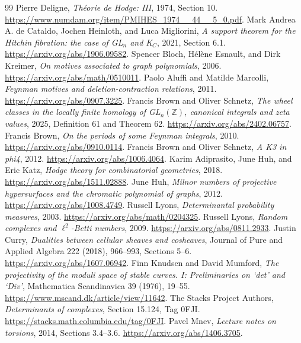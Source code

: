 \documentclass[11pt]{article}
\theoremstyle{definition}
\theoremstyle{remark}
\newcommand{\Z}{\mathbb Z}
\begin{document}
\begin{thebibliography}{99}
 Pierre Deligne, \emph{Th\'eorie de Hodge: III}, 1974, Section 10. \url{https://www.numdam.org/item/PMIHES_1974__44__5_0.pdf}.
 Mark Andrea A. de Cataldo, Jochen Heinloth, and Luca Migliorini, \emph{A support theorem for the Hitchin fibration: the case of GL\(_n\) and K\(_C\)}, 2021, Section 6.1. \url{https://arxiv.org/abs/1906.09582}.
 Spencer Bloch, H\'el\`ene Esnault, and Dirk Kreimer, \emph{On motives associated to graph polynomials}, 2006. \url{https://arxiv.org/abs/math/0510011}.
 Paolo Aluffi and Matilde Marcolli, \emph{Feynman motives and deletion-contraction relations}, 2011. \url{https://arxiv.org/abs/0907.3225}.
 Francis Brown and Oliver Schnetz, \emph{The wheel classes in the locally finite homology of GL\(_n(\Z)\), canonical integrals and zeta values}, 2025, Definition 61 and Theorem 62. \url{https://arxiv.org/abs/2402.06757}.
 Francis Brown, \emph{On the periods of some Feynman integrals}, 2010. \url{https://arxiv.org/abs/0910.0114}.
 Francis Brown and Oliver Schnetz, \emph{A K3 in phi4}, 2012. \url{https://arxiv.org/abs/1006.4064}.
 Karim Adiprasito, June Huh, and Eric Katz, \emph{Hodge theory for combinatorial geometries}, 2018. \url{https://arxiv.org/abs/1511.02888}.
 June Huh, \emph{Milnor numbers of projective hypersurfaces and the chromatic polynomial of graphs}, 2012. \url{https://arxiv.org/abs/1008.4749}.
 Russell Lyons, \emph{Determinantal probability measures}, 2003. \url{https://arxiv.org/abs/math/0204325}.
 Russell Lyons, \emph{Random complexes and \(\ell^2\)-Betti numbers}, 2009. \url{https://arxiv.org/abs/0811.2933}.
 Justin Curry, \emph{Dualities between cellular sheaves and cosheaves}, Journal of Pure and Applied Algebra 222 (2018), 966--993, Sections 5--6. \url{https://arxiv.org/abs/1607.06942}.
 Finn Knudsen and David Mumford, \emph{The projectivity of the moduli space of stable curves. I: Preliminaries on `det' and `Div'}, Mathematica Scandinavica 39 (1976), 19--55. \url{https://www.mscand.dk/article/view/11642}.
 The Stacks Project Authors, \emph{Determinants of complexes}, Section 15.124, Tag 0FJI. \url{https://stacks.math.columbia.edu/tag/0FJI}.
 Pavel Mnev, \emph{Lecture notes on torsions}, 2014, Sections 3.4--3.6. \url{https://arxiv.org/abs/1406.3705}.

\end{thebibliography}
\end{document}
